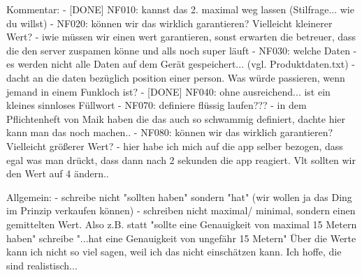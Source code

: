 
Kommentar:
- [DONE] NF010: kannst das 2. maximal weg lassen (Stilfrage... wie du willst)
- NF020: können wir das wirklich garantieren? Vielleicht kleinerer Wert?
    - iwie müssen wir einen wert garantieren, sonst erwarten die betreuer, dass die den server zuspamen könne und alls noch super läuft
- NF030: welche Daten - es werden nicht alle Daten auf dem Gerät gespeichert... (vgl. Produktdaten.txt)
    - dacht an die daten bezüglich position einer person. Was würde passieren, wenn jemand in einem Funkloch ist?
- [DONE] NF040: ohne ausreichend... ist ein kleines sinnloses Füllwort
- NF070: definiere flüssig laufen??? 
    - in dem Pflichtenheft von Maik haben die das auch so schwammig definiert, dachte hier kann man das noch machen..
- NF080: können wir das wirklich garantieren? Vielleicht größerer Wert?
    - hier habe ich mich auf die app selber bezogen, dass egal was man drückt, dass dann nach 2 sekunden die app reagiert. Vlt sollten wir den Wert auf 4 ändern..

Allgemein:
- schreibe nicht "sollten haben" sondern "hat" (wir wollen ja das Ding im Prinzip verkaufen können)
- schreiben nicht maximal/ minimal, sondern einen gemittelten Wert.
Also z.B. statt "sollte eine Genauigkeit von maximal 15 Metern haben" schreibe "...hat eine Genauigkeit von ungefähr 15 Metern"
Über die Werte kann ich nicht so viel sagen, weil ich das nicht einschätzen kann. Ich hoffe, die sind realistisch...